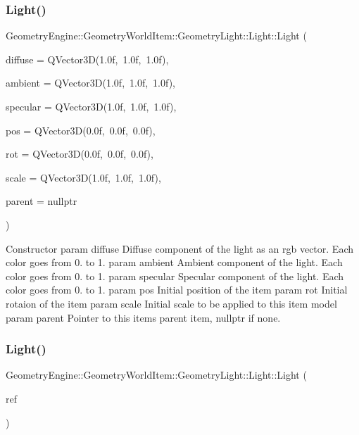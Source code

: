 \subsubsection{\texorpdfstring{Light()}{Light()}\hspace{0.1cm}{\footnotesize\ttfamily [1/2]}}
{\footnotesize\ttfamily Geometry\+Engine\+::\+Geometry\+World\+Item\+::\+Geometry\+Light\+::\+Light\+::\+Light (\begin{DoxyParamCaption}\item[{const Q\+Vector3D \&}]{diffuse = {\ttfamily QVector3D(1.0f,~1.0f,~1.0f)},  }\item[{const Q\+Vector3D \&}]{ambient = {\ttfamily QVector3D(1.0f,~1.0f,~1.0f)},  }\item[{const Q\+Vector3D \&}]{specular = {\ttfamily QVector3D(1.0f,~1.0f,~1.0f)},  }\item[{const Q\+Vector3D \&}]{pos = {\ttfamily QVector3D(0.0f,~0.0f,~0.0f)},  }\item[{const Q\+Vector3D \&}]{rot = {\ttfamily QVector3D(0.0f,~0.0f,~0.0f)},  }\item[{const Q\+Vector3D \&}]{scale = {\ttfamily QVector3D(1.0f,~1.0f,~1.0f)},  }\item[{\mbox{\hyperlink{class_geometry_engine_1_1_geometry_world_item_1_1_world_item}{World\+Item}} $\ast$}]{parent = {\ttfamily nullptr} }\end{DoxyParamCaption})}

Constructor param diffuse Diffuse component of the light as an rgb vector. Each color goes from 0. to 1. param ambient Ambient component of the light. Each color goes from 0. to 1. param specular Specular component of the light. Each color goes from 0. to 1. param pos Initial position of the item param rot Initial rotaion of the item param scale Initial scale to be applied to this item model param parent Pointer to this items parent item, nullptr if none. \mbox{\label{class_geometry_engine_1_1_geometry_world_item_1_1_geometry_light_1_1_light_a057f30d881c04f30fefa313c98902e34}} 
\subsubsection{\texorpdfstring{Light()}{Light()}\hspace{0.1cm}{\footnotesize\ttfamily [2/2]}}
{\footnotesize\ttfamily Geometry\+Engine\+::\+Geometry\+World\+Item\+::\+Geometry\+Light\+::\+Light\+::\+Light (\begin{DoxyParamCaption}\item[{const \mbox{\hyperlink{class_geometry_engine_1_1_geometry_world_item_1_1_geometry_light_1_1_light}{Light}} \&}]{ref }\end{DoxyParamCaption})\hspace{0.3cm}{\ttfamily [inline]}}

